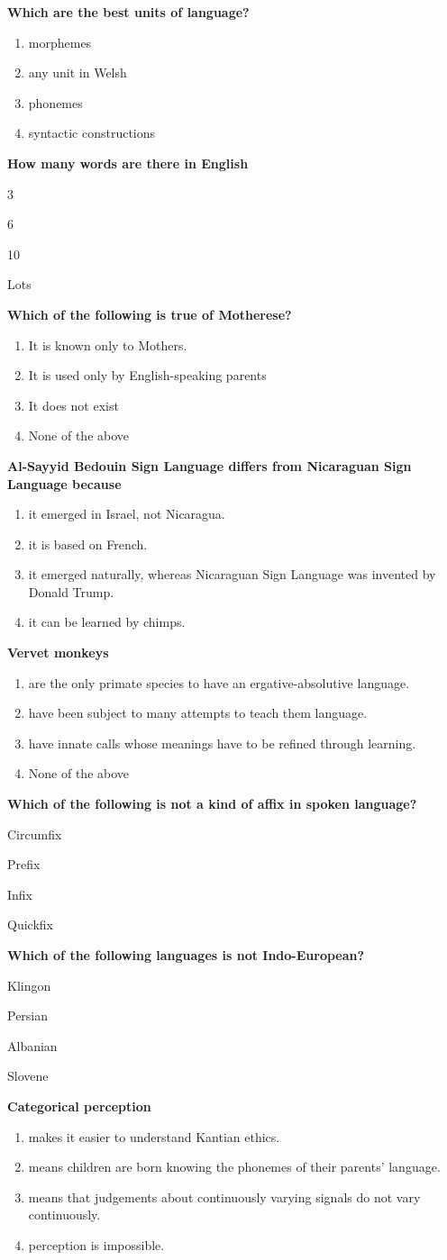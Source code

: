 \documentclass[12pt]{article}
\newcommand{\ba}{
\begin{flushleft}\begin{inparaenum}}
\newcommand{\ea}{\end{inparaenum}\end{flushleft}\end{samepage}\vspace{3mm}\pagebreak[3]}
\newcommand{\q}[1]{
\pagebreak[1]\begin{samepage}
\item \textbf{#1} \\
\nopagebreak
}
\newcommand{\ans}[1]{\item {#1}\hspace{2mm}}
\newcommand{\fixedans}[1]{\item {#1}\hspace{2mm}}
\newcommand{\balong}{

\begin{minipage}{1\linewidth}
\begin{enumerate}
}
\newcommand{\ealong}{
\end{enumerate}
\end{minipage}
\end{samepage}
\vspace{3mm}
\pagebreak[3]
}
\begin{document}
\begin{multicols}{2}
\begin{enumerate}

\q{Which are the best units of language?}

\balong %
\ans{morphemes}
\ans{any unit in Welsh}%
\ans{phonemes}
\ans{syntactic constructions}
\ealong


\q{How many words are there in English}
\ba %
\ans{3}
\ans{6}
\ans{10}
\ans{Lots}%
\ea


\q{Which of the following is true of Motherese?}

\balong
\ans{It is known only to Mothers.}
\ans{It is used only by English-speaking parents}
\ans{It does not exist}
\fixedans{None of the above}%
\ealong



\q{Al-Sayyid Bedouin Sign Language differs from Nicaraguan Sign Language because}

\balong
\ans{it emerged in Israel, not Nicaragua.}%
\ans{it is based on French.}
\ans{it emerged naturally, whereas Nicaraguan Sign Language was invented by Donald Trump.}
\ans{it can be learned by chimps.}
\ealong

\q{Vervet monkeys}

\balong
\ans{are the only primate species to have an ergative-absolutive language.}
\ans{have been subject to many attempts to teach them language.}
\ans{have innate calls whose meanings have to be refined through learning.}%
\fixedans{None of the above}
\ealong

\q{Which of the following is not a kind of affix in spoken language?}

\ba
\ans{Circumfix}
\ans{Prefix}
\ans{Infix}
\ans{Quickfix}%
\ea

\q{Which of the following languages is not Indo-European?}

\ba
\ans{Klingon}%
\ans{Persian}
\ans{Albanian}
\ans{Slovene}
\ea


\q{Categorical perception}

\balong
\ans{makes it easier to understand Kantian ethics.}
\ans{means children are born knowing the phonemes of their parents' language.}
\ans{means that judgements about continuously varying signals do not vary continuously.}%
\ans{perception is impossible.}
\ealong



\end{enumerate}
\end{multicols}
\end{document}
